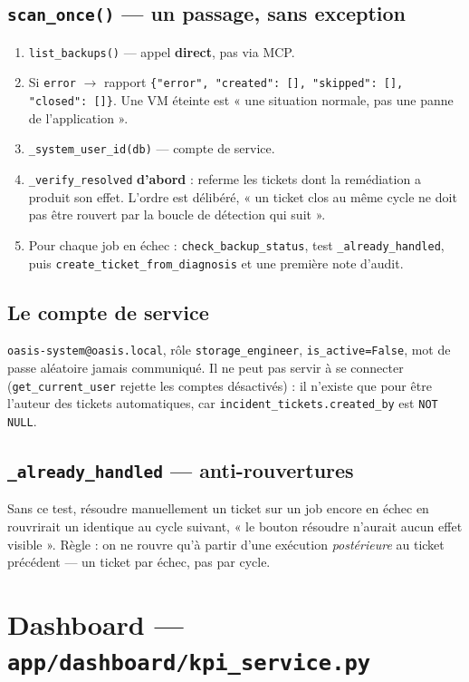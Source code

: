 \documentclass[11pt,a4paper]{report}
\newcommand{\file}[1]{\texttt{\small #1}}
\newcommand{\fn}[1]{\texttt{\small\textcolor{oasisviolet}{#1}}}
\newcommand{\arrowto}{\ensuremath{\rightarrow}}
\begin{document}
\subsection*{\fn{scan\_once()} --- un passage, sans exception}

\begin{enumerate}
  \item \fn{list\_backups()} --- appel \textbf{direct}, pas via MCP.
  \item Si \texttt{error} \arrowto{} rapport
  \texttt{\{"error", "created": [], "skipped": [], "closed": []\}}. Une VM
  éteinte est « une situation normale, pas une panne de l'application ».
  \item \fn{\_system\_user\_id(db)} --- compte de service.
  \item \fn{\_verify\_resolved} \textbf{d'abord} : referme les tickets dont la
  remédiation a produit son effet. L'ordre est délibéré, « un ticket clos au
  même cycle ne doit pas être rouvert par la boucle de détection qui suit ».
  \item Pour chaque job en échec : \fn{check\_backup\_status}, test
  \fn{\_already\_handled}, puis \fn{create\_ticket\_from\_diagnosis} et une
  première note d'audit.
\end{enumerate}

\subsection*{Le compte de service}
\texttt{oasis-system@oasis.local}, rôle \texttt{storage\_engineer},
\texttt{is\_active=False}, mot de passe aléatoire jamais communiqué. Il ne peut
pas servir à se connecter (\fn{get\_current\_user} rejette les comptes
désactivés) : il n'existe que pour être l'auteur des tickets automatiques, car
\texttt{incident\_tickets.created\_by} est \texttt{NOT NULL}.

\subsection*{\fn{\_already\_handled} --- anti-rouvertures}
Sans ce test, résoudre manuellement un ticket sur un job encore en échec en
rouvrirait un identique au cycle suivant, « le bouton résoudre n'aurait aucun
effet visible ». Règle : on ne rouvre qu'à partir d'une exécution
\emph{postérieure} au ticket précédent --- un ticket par échec, pas par cycle.

\section{Dashboard --- \file{app/dashboard/kpi\_service.py}}
\end{document}
